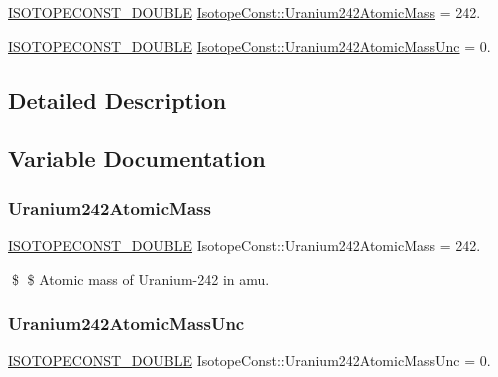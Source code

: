 \begin{DoxyCompactItemize}
\item 
\mbox{\hyperlink{group___isotope_const-_macros_ga8f45a7272ce02c0b4c65c44636ed719a}{I\+S\+O\+T\+O\+P\+E\+C\+O\+N\+S\+T\+\_\+\+D\+O\+U\+B\+LE}} \mbox{\hyperlink{group___isotope_const-_uranium-_u242_ga5c209594959ded147a529afd6464ced7}{Isotope\+Const\+::\+Uranium242\+Atomic\+Mass}} = 242.
\item 
\mbox{\hyperlink{group___isotope_const-_macros_ga8f45a7272ce02c0b4c65c44636ed719a}{I\+S\+O\+T\+O\+P\+E\+C\+O\+N\+S\+T\+\_\+\+D\+O\+U\+B\+LE}} \mbox{\hyperlink{group___isotope_const-_uranium-_u242_ga99fc9a285139a20c38381d348db6a673}{Isotope\+Const\+::\+Uranium242\+Atomic\+Mass\+Unc}} = 0.
\end{DoxyCompactItemize}


\subsection{Detailed Description}


\subsection{Variable Documentation}
\mbox{\label{group___isotope_const-_uranium-_u242_ga5c209594959ded147a529afd6464ced7}} 
\subsubsection{\texorpdfstring{Uranium242\+Atomic\+Mass}{Uranium242AtomicMass}}
{\footnotesize\ttfamily \mbox{\hyperlink{group___isotope_const-_macros_ga8f45a7272ce02c0b4c65c44636ed719a}{I\+S\+O\+T\+O\+P\+E\+C\+O\+N\+S\+T\+\_\+\+D\+O\+U\+B\+LE}} Isotope\+Const\+::\+Uranium242\+Atomic\+Mass = 242.}

\$ \$ Atomic mass of Uranium-\/242 in amu. \mbox{\label{group___isotope_const-_uranium-_u242_ga99fc9a285139a20c38381d348db6a673}} 
\subsubsection{\texorpdfstring{Uranium242\+Atomic\+Mass\+Unc}{Uranium242AtomicMassUnc}}
{\footnotesize\ttfamily \mbox{\hyperlink{group___isotope_const-_macros_ga8f45a7272ce02c0b4c65c44636ed719a}{I\+S\+O\+T\+O\+P\+E\+C\+O\+N\+S\+T\+\_\+\+D\+O\+U\+B\+LE}} Isotope\+Const\+::\+Uranium242\+Atomic\+Mass\+Unc = 0.}

